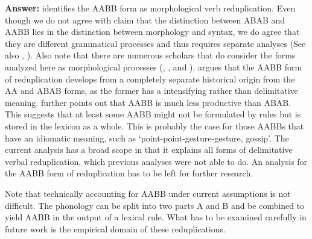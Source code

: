 \documentclass[fleqn,twoside]{article}
\begin{document}
\begin{enumerate}
\noindent
\textbf{Answer:}
\citet{Xie2020} identifies the AABB form as morphological verb reduplication.
Even though we do not agree with  claim that the distinction between ABAB and AABB lies in the distinction between morphology and syntax,
we do agree that they are different grammatical processes and thus requires separate analyses (See also \citealt[Sec. 4.3]{Deng2013}, \citealt{Wang2023}).
Also note that there are numerous scholars that do consider the forms analyzed here as morphological processes (\citealt[Ch. 4]{Chao1968}, \citealt[Ch. 3]{LiThompson1981}, \citealt[4--5]{Liao2014} and \citealt[Sec. 4]{Sui2018}).
\citet[14--15]{Zhang2000} argues that the AABB form of reduplication develops from a completely separate historical origin from the AA and ABAB forms,
as the former has a intensifying rather than delimitative meaning.
\citet[83--84]{Xie2020} further points out that AABB is much less productive than ABAB.
This suggests that at least some AABB might not be formulated by rules but is stored in the lexicon as a whole.
This is probably the case for those AABBs that have an idiomatic meaning, such as  `point-point-gesture-gesture, gossip'.
The current analysis has a broad scope in that it explains all forms of delimitative verbal reduplication, which previous analyses were not able to do.
An analysis for the AABB form of reduplication has to be left for further research.

Note that technically accounting for AABB under current assumptions is not difficult. The phonology
can be split into two parts A and B and be combined to yield AABB in the output of a lexical
rule. What has to be examined carefully in future work
is the empirical domain of these reduplications.



\end{enumerate}
\end{document}
